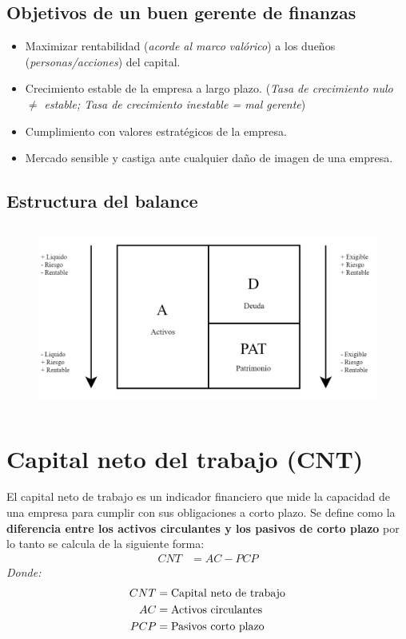 \documentclass{templateNote}
\begin{document}
\subsection{Objetivos de un buen gerente de finanzas}
\begin{itemize}
    \item Maximizar rentabilidad (\textit{acorde al marco valórico}) a los dueños (\textit{personas/acciones}) del capital.
    \item Crecimiento estable de la empresa a largo plazo. (\textit{Tasa de crecimiento nulo $\neq$ estable; Tasa de crecimiento inestable = mal gerente})
    \item Cumplimiento con valores estratégicos de la empresa.
    \item Mercado sensible y castiga ante cualquier daño de imagen de una empresa.
\end{itemize}

\subsection{Estructura del balance}
\begin{figure}[H]
    \centering
    \includegraphics[height=6cm]{img/estrucBalance.png}
\end{figure}
\newpage

\section{Capital neto del trabajo (CNT)}\label{sec:Capital neto del trabajo (CNT)}
\noindent El capital neto de trabajo es un indicador financiero que mide la capacidad de una empresa para cumplir con sus obligaciones a corto plazo. Se define como la \textbf{diferencia entre los activos circulantes y los pasivos de corto plazo} por lo tanto se calcula de la siguiente forma:
\begin{align*}
    CNT &= AC - PCP
\end{align*}
\textit{Donde:}
\begin{align*}
    CNT &= \textnormal{Capital neto de trabajo}\\
    AC &= \textnormal{Activos circulantes}\\
    PCP &= \textnormal{Pasivos corto plazo}
\end{align*}
\end{document}

